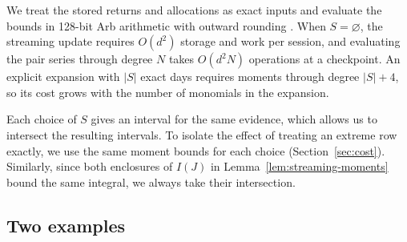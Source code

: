 \documentclass{article}
\numberwithin{equation}{section}
\newcounter{algorithm}
\theoremstyle{remark}
\begin{document}
\begin{center}
\begin{minipage}{0.96\linewidth}
\label{alg:certificate}
\end{minipage}
\end{center}

We treat the stored returns and allocations as exact inputs and evaluate
the bounds in 128-bit Arb arithmetic with outward rounding
\citep{johansson2017arb,pythonflint}. When $S=\varnothing$, the streaming
update requires $O(d^2)$ storage and work per session, and evaluating
the pair series through degree $N$ takes $O(d^2N)$ operations at a
checkpoint. An explicit expansion with $|S|$ exact days requires
moments through degree $|S|+4$, so its cost grows with the number of
monomials in the expansion.

Each choice of $S$ gives an interval for the same evidence, which allows
us to intersect the resulting intervals. To isolate the effect of treating
an extreme row exactly, we use the same moment bounds for each choice
(Section~\ref{sec:cost}). Similarly, since both enclosures of $I(J)$ in
Lemma~\ref{lem:streaming-moments} bound the same integral, we always
take their intersection.

\subsection{Two examples}\label{sec:examples}
\end{document}
